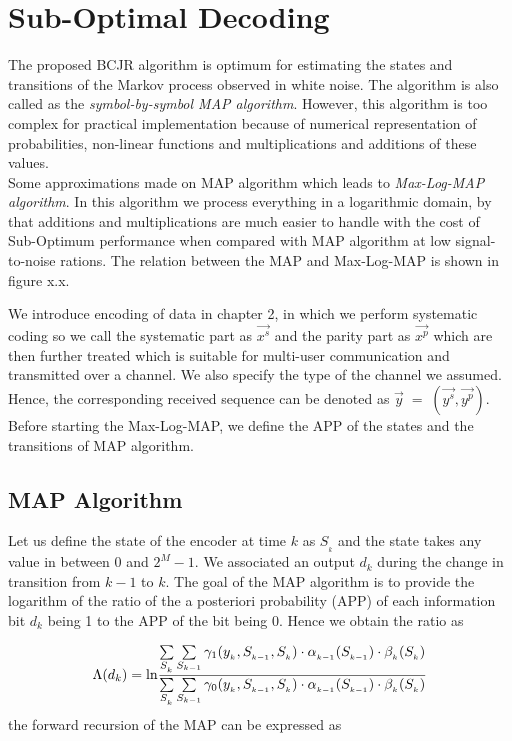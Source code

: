 \section{Sub-Optimal Decoding}
The proposed BCJR algorithm is optimum for estimating the states and transitions of the Markov process observed in white noise. The algorithm is also called as the \textit{symbol-by-symbol MAP algorithm}. However, this algorithm is too complex for practical implementation because of numerical representation of probabilities, non-linear functions and multiplications and additions of these values. \\

Some approximations made on MAP algorithm which leads to \textit{Max-Log-MAP algorithm}. In this algorithm we process everything in a logarithmic domain, by that additions and multiplications are much easier to handle with the cost of Sub-Optimum performance when compared with MAP algorithm at low signal-to-noise rations. The relation between the MAP and Max-Log-MAP is shown in figure x.x.

We introduce encoding of data in chapter 2, in which we perform systematic coding so we call the systematic part as $\vec{x^{s}}$ and the parity part as $\vec{x^{p}}$ which are then further treated which is suitable for multi-user communication and transmitted over a channel. We also specify the type of the channel we assumed. Hence, the corresponding received sequence can be denoted as $\vec{y}\;=\;(\vec{y^{s}},\vec{y^{p}})$. \\

Before starting the Max-Log-MAP, we define the APP of the states and the transitions of MAP algorithm.

\subsection{MAP Algorithm}
Let us define the state of the encoder at time $k$ as $S_{_k}$ and the state takes any value in between 0 and $2^{M}-1$. We associated an output $d_k$ during the change in transition from $k-1$ to $k$. The goal of the MAP algorithm is to provide the logarithm of the ratio of the a posteriori probability (APP) of each information bit $d_k$ being 1 to the APP of the bit being 0. Hence we obtain the ratio as

\begin{equation}
\Lambda(d_k)=\mathrm{ln}\frac{\hbox{$\sum\limits_{S_{_k}}\sum\limits_{S_{k-1}}\gamma_1(y_{_k},S_{_{k-1}},S_{_{k}})\cdot \alpha_{_{k-1}}(S_{_{k-1}})\cdot \beta_{_k}(S_{_k})$}}{\hbox{$\sum\limits_{S_{_k}}\sum\limits_{S_{k-1}}\gamma_0(y_{_k},S_{_{k-1}},S_{_{k}})\cdot \alpha_{_{k-1}}(S_{_{k-1}})\cdot \beta_{_k}(S_{_k})$}}
\end{equation}
the forward recursion of the MAP can be expressed as

